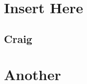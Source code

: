 \begin{appendices}
	\renewcommand{\appendixname}{}%
	
	\appendix
\chapter{Insert Here}
\label{app:Insert Here}	
\section{Craig}
\newpage

\chapter{Another}
\label{app:Another}
\end{appendices}